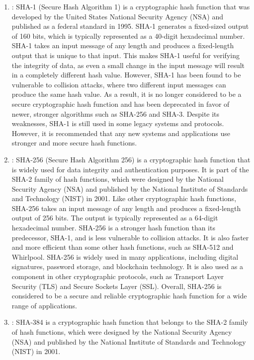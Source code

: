 \documentclass{article}
\newcommand{\code}[1]{\tcbox[
    on line,
    colback=codebackground, boxsep=2pt,
    colframe=white, boxrule=0pt,
    top=0pt, bottom=0pt, left=0pt, right=0pt
]{\texttt{#1}}}
\begin{document}
\begin{enumerate}
    \item \code{SHA1()}:
          SHA-1 (Secure Hash Algorithm 1) is a cryptographic hash function that was developed by the United States National Security Agency (NSA) and published as a federal standard in 1995. SHA-1 generates a fixed-sized output of 160 bits, which is typically represented as a 40-digit hexadecimal number.
          SHA-1 takes an input message of any length and produces a fixed-length output that is unique to that input. This makes SHA-1 useful for verifying the integrity of data, as even a small change in the input message will result in a completely different hash value.
          However, SHA-1 has been found to be vulnerable to collision attacks, where two different input messages can produce the same hash value. As a result, it is no longer considered to be a secure cryptographic hash function and has been deprecated in favor of newer, stronger algorithms such as SHA-256 and SHA-3.
          Despite its weaknesses, SHA-1 is still used in some legacy systems and protocols. However, it is recommended that any new systems and applications use stronger and more secure hash functions.
    \item \code{SHA256()}:
          SHA-256 (Secure Hash Algorithm 256) is a cryptographic hash function that is widely used for data integrity and authentication purposes. It is part of the SHA-2 family of hash functions, which were designed by the National Security Agency (NSA) and published by the National Institute of Standards and Technology (NIST) in 2001.
          Like other cryptographic hash functions, SHA-256 takes an input message of any length and produces a fixed-length output of 256 bits. The output is typically represented as a 64-digit hexadecimal number.
          SHA-256 is a stronger hash function than its predecessor, SHA-1, and is less vulnerable to collision attacks.
          It is also faster and more efficient than some other hash functions, such as SHA-512 and Whirlpool.
          SHA-256 is widely used in many applications, including digital signatures, password storage, and blockchain technology.
          It is also used as a component in other cryptographic protocols, such as Transport Layer Security (TLS) and Secure Sockets Layer (SSL).
          Overall, SHA-256 is considered to be a secure and reliable cryptographic hash function for a wide range of applications.
    \item \code{SHA384()}:
          SHA-384 is a cryptographic hash function that belongs to the SHA-2 family of hash functions, which were designed by the National Security Agency (NSA) and published by the National Institute of Standards and Technology (NIST) in 2001.

\end{enumerate}
\end{document}
